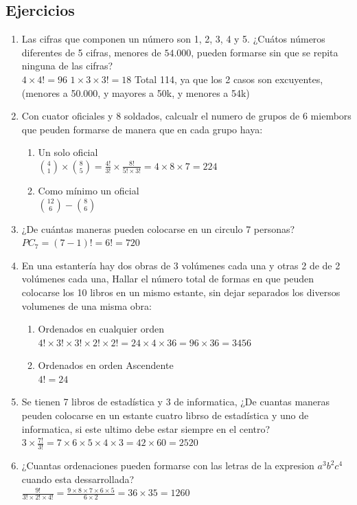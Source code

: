 \documentclass[12pt, letterpaper]{article}
\begin{document}
\subsection{Ejercicios}
\begin{enumerate}
	\item Las cifras que componen un número son 1, 2, 3, 4 y 5. ¿Cuátos números diferentes de 5 cifras, menores de $54.000$, pueden formarse sin que se repita ninguna de las cifras? \\
        $4 \times 4! = 96$ $1 \times 3 \times 3! = 18 $ Total 114, ya que los 2 casos son excuyentes, (menores a 50.000, y mayores a 50k, y menores a 54k)
	\item Con cuator oficiales y 8 soldados, calcualr el numero de grupos de 6 miembors que peuden formarse de manera que en cada grupo haya:
	      \begin{enumerate}
		      \item Un solo oficial \\
                  $\binom{4}{1} \times \binom{8}{5} = \frac{4!}{3!} \times \frac{8!}{5! \times 3!} = 4 \times 8 \times 7 = 224 $
		      \item Como mínimo un oficial \\
                  $\binom{12}{6} - \binom{8}{6} $
	      \end{enumerate}
	\item ¿De cuántas maneras pueden colocarse en un circulo 7 personas? \\ 
        $PC_7 = (7-1)! = 6! = 720$
	\item En una estantería hay dos obras de 3 volúmenes cada una y otras 2 de de 2 volúmenes cada una, Hallar el número total de formas en que peuden colocarse los 10 libros en un mismo estante, sin dejar separados los diversos volumenes de una misma obra:
	      \begin{enumerate}
		      \item Ordenados en cualquier orden \\
                  $4! \times 3! \times 3! \times 2! \times 2! = 24 \times 4 \times 36 = 96 \times 36 = 3456$
		      \item Ordenados en orden Ascendente \\
                  $4! = 24$
	      \end{enumerate}
	\item Se tienen 7 libros de estadística y 3 de informatica, ¿De cuantas maneras peuden colocarse en un estante cuatro librso de estadística y uno de informatica, si este ultimo debe estar siempre en el centro? \\
        $3 \times \frac{7!}{3!} = 7 \times 6 \times 5 \times 4 \times 3 = 42 \times 60 = 2520 $
    \item ¿Cuantas ordenaciones pueden formarse con las letras de la expresion $a^3b^2c^4$ cuando esta dessarrollada? \\
        $\frac{9!}{3! \times 2! \times 4!} = \frac{9 \times 8 \times 7 \times 6 \times 5}{6 \times 2} = 36 \times 35 = 1260 $
\end{enumerate}
\end{document}
